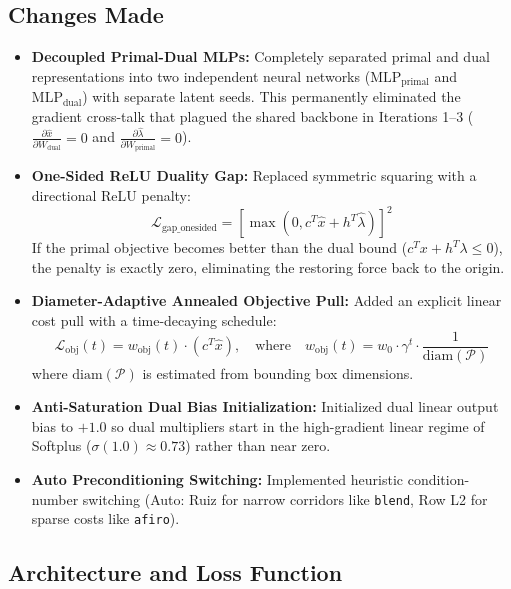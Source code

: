 \documentclass[11pt,a4paper]{article}
\begin{document}
\subsection{Changes Made}
\begin{itemize}[leftmargin=1.5em, itemsep=2pt]
    \item \textbf{Decoupled Primal-Dual MLPs:} Completely separated primal and dual representations into two independent neural networks ($\text{MLP}_{\text{primal}}$ and $\text{MLP}_{\text{dual}}$) with separate latent seeds. This permanently eliminated the gradient cross-talk that plagued the shared backbone in Iterations 1--3 ($\frac{\partial \hat{x}}{\partial W_{\text{dual}}} = 0$ and $\frac{\partial \hat{\lambda}}{\partial W_{\text{primal}}} = 0$).
    \item \textbf{One-Sided ReLU Duality Gap:} Replaced symmetric squaring with a directional ReLU penalty:
    \begin{equation}
        \mathcal{L}_{\text{gap\_onesided}} = \left[\max(0, c^T \hat{x} + h^T \hat{\lambda})\right]^2
    \end{equation}
    If the primal objective becomes better than the dual bound ($c^T x + h^T \lambda \le 0$), the penalty is exactly zero, eliminating the restoring force back to the origin.
    \item \textbf{Diameter-Adaptive Annealed Objective Pull:} Added an explicit linear cost pull with a time-decaying schedule:
    \begin{equation}
        \mathcal{L}_{\text{obj}}(t) = w_{\text{obj}}(t) \cdot (c^T \hat{x}), \quad \text{where} \quad w_{\text{obj}}(t) = w_0 \cdot \gamma^t \cdot \frac{1}{\text{diam}(\mathcal{P})}
    \end{equation}
    where $\text{diam}(\mathcal{P})$ is estimated from bounding box dimensions.
    \item \textbf{Anti-Saturation Dual Bias Initialization:} Initialized dual linear output bias to $+1.0$ so dual multipliers start in the high-gradient linear regime of Softplus ($\sigma(1.0) \approx 0.73$) rather than near zero.
    \item \textbf{Auto Preconditioning Switching:} Implemented heuristic condition-number switching (Auto: Ruiz for narrow corridors like \texttt{blend}, Row L2 for sparse costs like \texttt{afiro}).
\end{itemize}

\subsection{Architecture and Loss Function}
\end{document}
